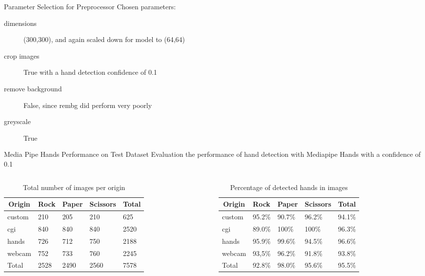\documentclass[aspectratio=169]{beamer}
\begin{document}
{\begin{frame}{Parameter Selection for Preprocessor}
    Chosen parameters:
    \begin{description}
    \item[dimensions] (300,300), and again scaled down for model to (64,64)
    \item[crop images] True with a hand detection confidence of 0.1
    \item[remove background] False, since rembg did perform very poorly
    \item[greyscale] True
	 \end{description}        

\end{frame}

\begin{frame}{Media Pipe Hands Performance on Test Dataset}
	Evaluation the performance of hand detection with Mediapipe Hands with a confidence of 0.1

\begin{columns}[c]

    \begin{column}{.5\textwidth}
    \begin{table}[]
\begin{tabular}{@{}lllll@{}}
\toprule
\multicolumn{1}{c}{Origin} & Rock & Paper & Scissors & Total \\ \midrule
custom                     & 210  & 205   & 210      & 625   \\
cgi                        & 840  & 840   & 840      & 2520  \\
hands                      & 726  & 712   & 750      & 2188  \\
webcam                     & 752  & 733   & 760      & 2245  \\
Total                      & 2528 & 2490  & 2560     & 7578  \\ \bottomrule
\end{tabular}
\caption{Total number of images per origin}
\end{table}
    \end{column}

    \begin{column}{.5\textwidth}
    \begin{table}[]
\begin{tabular}{@{}lllll@{}}
\toprule
\multicolumn{1}{c}{Origin} & Rock   & Paper  & Scissors & Total  \\ \midrule
custom                     & 95.2\% & 90.7\% & 96.2\%   & 94.1\% \\
cgi                        & 89.0\% & 100\%  & 100\%    & 96.3\% \\
hands                      & 95.9\% & 99.6\% & 94.5\%   & 96.6\% \\
webcam                     & 93,5\% & 96.2\% & 91.8\%   & 93.8\% \\
Total                      & 92.8\% & 98.0\% & 95.6\%   & 95.5\% \\ \bottomrule
\end{tabular}
\caption{Percentage of detected hands in images}
\end{table}
    \end{column}
   

\end{columns}
\end{frame}}
\end{document}
